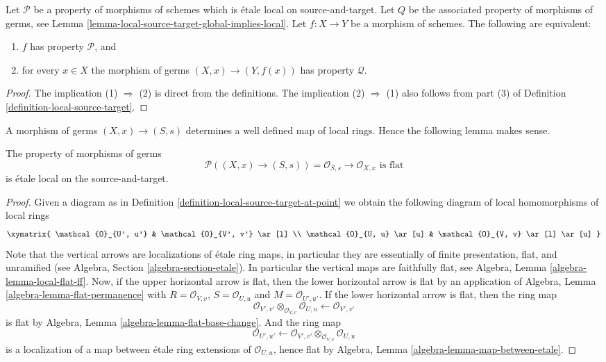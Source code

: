 \begin{lemma}
\label{lemma-local-source-target-local-implies-global}
Let $\mathcal{P}$ be a property of morphisms of schemes which is
\'etale local on source-and-target. Let $Q$ be the associated property
of morphisms of germs, see
Lemma \ref{lemma-local-source-target-global-implies-local}.
Let $f : X \to Y$ be a morphism
of schemes. The following are equivalent:
\begin{enumerate}
\item $f$ has property $\mathcal{P}$, and
\item for every $x \in X$ the morphism of germs $(X, x) \to (Y, f(x))$
has property $\mathcal{Q}$.
\end{enumerate}
\end{lemma}

\begin{proof}
The implication (1) $\Rightarrow$ (2) is direct from the definitions.
The implication (2) $\Rightarrow$ (1) also follows from part (3) of
Definition \ref{definition-local-source-target}.
\end{proof}

\noindent
A morphism of germs $(X, x) \to (S, s)$ determines a well defined
map of local rings. Hence the following lemma makes sense.

\begin{lemma}
\label{lemma-flat-at-point}
The property of morphisms of germs
$$
\mathcal{P}((X, x) \to (S, s)) =
\mathcal{O}_{S, s} \to \mathcal{O}_{X, x}\text{ is flat}
$$
is \'etale local on the source-and-target.
\end{lemma}

\begin{proof}
Given a diagram as in
Definition \ref{definition-local-source-target-at-point}
we obtain the following diagram of local homomorphisms of local rings
$$
\xymatrix{
\mathcal{O}_{U', u'} & \mathcal{O}_{V', v'} \ar[l] \\
\mathcal{O}_{U, u} \ar[u] & \mathcal{O}_{V, v} \ar[l] \ar[u]
}
$$
Note that the vertical arrows are localizations of \'etale ring maps,
in particular they are essentially of finite presentation, flat,
and unramified (see
Algebra, Section \ref{algebra-section-etale}).
In particular the vertical maps are faithfully flat, see
Algebra, Lemma \ref{algebra-lemma-local-flat-ff}.
Now, if the upper horizontal arrow is flat, then the lower horizontal
arrow is flat by an application of
Algebra, Lemma \ref{algebra-lemma-flat-permanence}
with $R = \mathcal{O}_{V, v}$, $S = \mathcal{O}_{U, u}$ and
$M = \mathcal{O}_{U', u'}$. If the lower horizontal arrow is
flat, then the ring map
$$
\mathcal{O}_{V', v'} \otimes_{\mathcal{O}_{V, v}} \mathcal{O}_{U, u}
\longleftarrow
\mathcal{O}_{V', v'}
$$
is flat by
Algebra, Lemma \ref{algebra-lemma-flat-base-change}.
And the ring map
$$
\mathcal{O}_{U', u'}
\longleftarrow
\mathcal{O}_{V', v'} \otimes_{\mathcal{O}_{V, v}} \mathcal{O}_{U, u}
$$
is a localization of a map between \'etale ring extensions of
$\mathcal{O}_{U, u}$, hence flat by
Algebra, Lemma \ref{algebra-lemma-map-between-etale}.
\end{proof}

